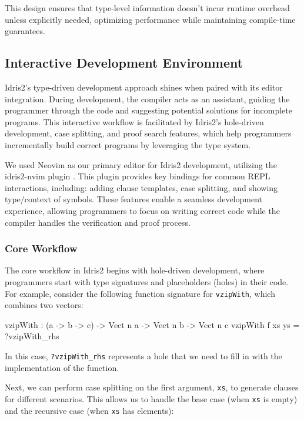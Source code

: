 \documentclass[]{rptuseminar}
\begin{document}
This design ensures that type-level information doesn't incur runtime overhead unless explicitly needed, optimizing performance while maintaining compile-time guarantees.

\subsection{Interactive Development Environment}  
\label{sec:interactive-development-environment}
Idris2's type-driven development approach shines when paired with its editor integration. During development, the compiler acts as an assistant, guiding the programmer through the code and suggesting potential solutions for incomplete programs. This interactive workflow is facilitated by Idris2's hole-driven development, case splitting, and proof search features, which help programmers incrementally build correct programs by leveraging the type system.

We used Neovim as our primary editor for Idris2 development, utilizing the idris2-nvim plugin \cite{repo-key}. This plugin provides key bindings for common REPL interactions, including: adding clause templates, case splitting, and showing type/context of symbols. These features enable a seamless development experience, allowing programmers to focus on writing correct code while the compiler handles the verification and proof process. 

\subsubsection{Core Workflow}
The core workflow in Idris2 begins with hole-driven development, where programmers start with type signatures and placeholders (holes) in their code. For example, consider the following function signature for \texttt{vzipWith}, which combines two vectors:

\begin{idris}
vzipWith : (a -> b -> c) -> Vect n a -> Vect n b -> Vect n c
vzipWith f xs ys = ?vzipWith_rhs
\end{idris}

In this case, \texttt{?vzipWith\_rhs} represents a hole that we need to fill in with the implementation of the function.

Next, we can perform case splitting on the first argument, \texttt{xs}, to generate clauses for different scenarios. This allows us to handle the base case (when \texttt{xs} is empty) and the recursive case (when \texttt{xs} has elements):
\end{document}
